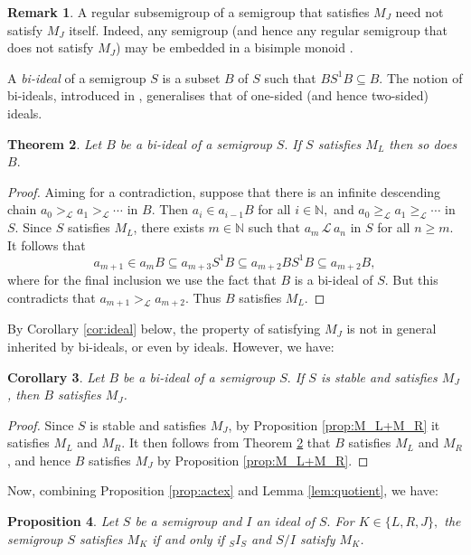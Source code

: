 \documentclass[twoside,a4paper,12pt,reqno]{amsart}
\theoremstyle{plain}
\newtheorem{thm}{Theorem}[section]
\newtheorem{cor}[thm]{Corollary}
\newtheorem{prop}[thm]{Proposition}
\theoremstyle{definition}
\newtheorem{rem}[thm]{Remark}
\renewcommand{\l}{\mbox{${\mathcal{L}}$}}
\newcommand{\geql}{\geq_{\mathcal{L}}}
\newcommand{\gl}{>_{\mathcal{L}}}
\newcommand{\N}{\mathbb{N}}
\begin{document}
\begin{rem}
A regular subsemigroup of a semigroup that satisfies $M_J$ need not satisfy $M_J$ itself.  Indeed, any semigroup (and hence any regular semigroup that does not satisfy $M_J$) may be embedded in a bisimple monoid \cite[Corollary 1]{Higgins:1990}.
\end{rem}

A {\em bi-ideal} of a semigroup $S$ is a subset $B$ of $S$ such that $BS^1B\subseteq B.$  The notion of bi-ideals, introduced in \cite{Good}, generalises that of one-sided (and hence two-sided) ideals.

\begin{thm}\label{thm:bi-ideal}
Let $B$ be a bi-ideal of a semigroup $S.$  If $S$ satisfies $M_L$ then so does $B.$
\end{thm}

\begin{proof}
Aiming for a contradiction, suppose that there is an infinite descending chain $a_0\gl a_1\gl\cdots$ in $B.$  Then $a_i\in a_{i-1}B$ for all $i\in\N,$ and $a_0\geql a_1\geql\cdots$ in $S.$  Since $S$ satisfies $M_L$, there exists $m\in\N$ such that $a_m\,\l\,a_n$ in $S$ for all $n\geq m.$  It follows that
$$a_{m+1}\in a_mB\subseteq a_{m+3}S^1B\subseteq a_{m+2}BS^1B\subseteq a_{m+2}B,$$
where for the final inclusion we use the fact that $B$ is a bi-ideal of $S.$  But this contradicts that $a_{m+1}\gl a_{m+2}$.  Thus $B$ satisfies $M_L$.
\end{proof}

By Corollary \ref{cor:ideal} below, the property of satisfying $M_J$ is not in general inherited by bi-ideals, or even by ideals.  However, we have:

\begin{cor}
Let $B$ be a bi-ideal of a semigroup $S.$  If $S$ is stable and satisfies $M_J$, then $B$ satisfies $M_J$.
\end{cor}

\begin{proof}
Since $S$ is stable and satisfies $M_J$, by Proposition \ref{prop:M_L+M_R} it satisfies $M_L$ and $M_R$.  It then follows from Theorem \ref{thm:bi-ideal} that $B$ satisfies $M_L$ and $M_R$, and hence $B$ satisfies $M_J$ by Proposition \ref{prop:M_L+M_R}.
\end{proof} 

Now, combining Proposition \ref{prop:actex} and Lemma \ref{lem:quotient}, we have:

\begin{prop}\label{prop:sgpext}
Let $S$ be a semigroup and $I$ an ideal of $S.$  For $K\in\{L,R,J\},$ the semigroup $S$ satisfies $M_K$ if and only if ${_S}I_S$ and $S/I$ satisfy $M_K$.
\end{prop}
\end{document}
